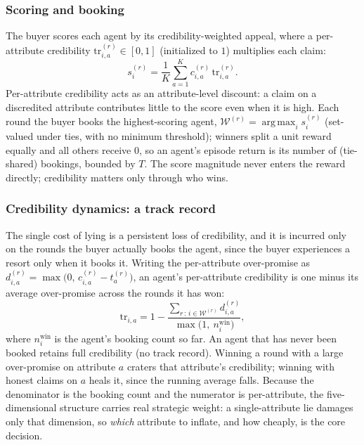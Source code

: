 \subsubsection{Scoring and booking}
The buyer scores each agent by its credibility-weighted appeal, where a per-attribute credibility $\mathrm{tr}_{i,a}^{(r)}\in[0,1]$ (initialized to $1$) multiplies each claim:
\begin{equation}
s_i^{(r)} = \frac{1}{K}\sum_{a=1}^{K} c_{i,a}^{(r)}\,\mathrm{tr}_{i,a}^{(r)}.
\label{eq:dec5-score}
\end{equation}
Per-attribute credibility acts as an attribute-level discount: a claim on a discredited attribute contributes little to the score even when it is high. Each round the buyer books the highest-scoring agent, $\mathcal{W}^{(r)}=\operatorname*{arg\,max}_i s_i^{(r)}$ (set-valued under ties, with no minimum threshold); winners split a unit reward equally and all others receive $0$, so an agent's episode return is its number of (tie-shared) bookings, bounded by $T$. The score magnitude never enters the reward directly; credibility matters only through who wins.

\subsubsection{Credibility dynamics: a track record}
The single cost of lying is a persistent loss of credibility, and it is incurred only on the rounds the buyer actually books the agent, since the buyer experiences a resort only when it books it. Writing the per-attribute over-promise as $d_{i,a}^{(r)} = \max\!\bigl(0,\, c_{i,a}^{(r)} - t_a^{(r)}\bigr)$, an agent's per-attribute credibility is one minus its average over-promise across the rounds it has won:
\begin{equation}
\mathrm{tr}_{i,a} = 1 - \frac{\sum_{r\,:\,i\in\mathcal{W}^{(r)}} d_{i,a}^{(r)}}{\max\!\bigl(1,\ n_i^{\mathrm{win}}\bigr)},
\label{eq:dec5-trust}
\end{equation}
where $n_i^{\mathrm{win}}$ is the agent's booking count so far. An agent that has never been booked retains full credibility (no track record). Winning a round with a large over-promise on attribute $a$ craters that attribute's credibility; winning with honest claims on $a$ heals it, since the running average falls. Because the denominator is the booking count and the numerator is per-attribute, the five-dimensional structure carries real strategic weight: a single-attribute lie damages only that dimension, so \emph{which} attribute to inflate, and how cheaply, is the core decision.

